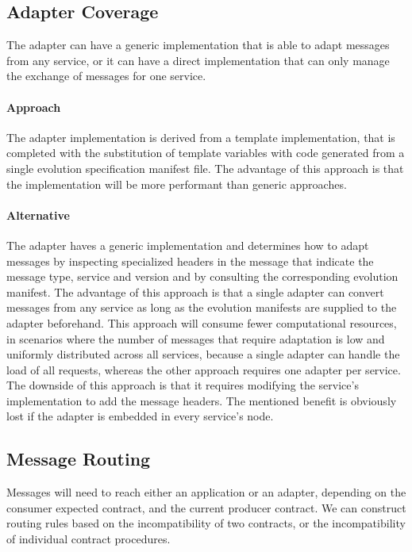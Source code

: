 \subsection{Adapter Coverage} %
\label{sec:adapter_polymorphism}

The adapter can have a generic implementation that is able to adapt messages from any service, or it can
have a direct implementation that can only manage the exchange of messages for one service.

\paragraph{Approach}
The adapter implementation is derived from a template implementation,
that is completed with the substitution of template variables with code generated from a single evolution specification manifest file.
The advantage of this approach is that the implementation will be more performant than generic approaches.

\paragraph{Alternative}
The adapter haves a generic implementation and determines how to adapt messages by inspecting specialized headers in the
message that indicate the message type, service and version and by consulting the corresponding evolution manifest.
The advantage of this approach is that a single adapter can convert messages from any service as long as the evolution manifests are supplied to the adapter beforehand.
This approach will consume fewer computational resources, in scenarios where the number of messages that require adaptation is low and uniformly distributed across all services,
because a single adapter can handle the load of all requests, whereas the other approach requires one adapter per service.
The downside of this approach is that it requires modifying the service's implementation to add the message headers.
The mentioned benefit is obviously lost if the adapter is embedded in every service's node.

\subsection{Message Routing} %
\label{sec:message_routing}

Messages will need to reach either an application or an adapter, depending on the consumer expected contract, and the current producer contract.
We can construct routing rules based on the incompatibility of two contracts, or the incompatibility of individual contract procedures.

